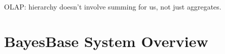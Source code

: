 \documentclass{acm_proc_article-sp}
\begin{document}
OLAP: hierarchy doesn't involve summing for us, not just aggregates.
%
%
%
%
%
%
%
%


\section{BayesBase System Overview} 
\end{document}

